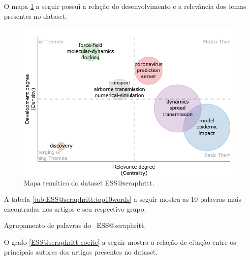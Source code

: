 O mapa \ref{ESS@seraphritt-themap} a seguir possui a relação do desenvolvimento e a relevância dos temas presentes no dataset.

\begin{figure}
    \centering
    \includegraphics[width=\textwidth]{exploratory-data-analysis/seraphritt/PesqBibliogr/Virus-Network/themap.png}
    \caption{Mapa temático do dataset ESS@seraphritt.}
    \label{ESS@seraphritt-themap}
\end{figure}

A tabela \ref{tab:ESS@seraphritt:top10words} a seguir mostra as 10 palavras mais encontradas nos artigos e seu respectivo grupo.

\begin{table}[htp]
\centering
{}
    \caption{Agrupamento de palavras do \dataset\ ESS@seraphritt.}
    \label{tab:ESS@seraphritt:top10words}
\end{table}

O grafo \ref{ESS@seraphritt-cocite} a seguir mostra a relação de citação entre os principais autores dos artigos presentes no dataset.

